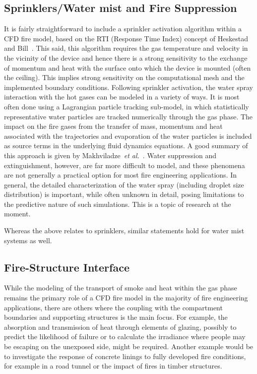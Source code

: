 \documentclass[graybox]{svmult}
\begin{document}
\subsection{Sprinklers/Water mist and Fire Suppression}

It is fairly straightforward to include a sprinkler activation algorithm within a CFD fire model, based on the RTI (Response Time Index) concept of Heskestad and Bill~\cite{Heskestad:1988}. This said, this algorithm requires the gas temperature and velocity in the vicinity of the device and hence there is a strong sensitivity to the exchange of momentum and heat with the surface onto which the device is mounted (often the ceiling). This implies strong sensitivity on the computational mesh and the implemented boundary conditions. Following sprinkler activation, the water spray interaction with the hot gases can be modeled in a variety of ways. It is most often done using a Lagrangian particle tracking sub-model, in which statistically representative water particles are tracked numerically through the gas phase. The impact on the fire gases from the transfer of mass, momentum and heat associated with the trajectories and evaporation of the water particles is included as source terms in the underlying fluid dynamics equations. A good summary of this approach is given by Makhviladze~{\em et al.}~\cite{Makhviladze}. Water suppression and extinguishment, however, are far more difficult to model, and these phenomena are not generally a practical option for most fire engineering applications. In general, the detailed characterization of the water spray (including droplet size distribution) is important, while often unknown in detail, posing limitations to the predictive nature of such simulations. This is a topic of research at the moment.

Whereas the above relates to sprinklers, similar statements hold for water mist systems as well.


\subsection{Fire-Structure Interface}

While the modeling of the transport of smoke and heat within the gas phase remains the primary role of a CFD fire model in the majority of fire engineering applications, there are others where the coupling with the compartment boundaries and supporting structures is the main focus. For example, the absorption and transmission of heat through elements of glazing, possibly to predict the likelihood of failure or to calculate the irradiance where people may be escaping on the unexposed side, might be required. Another example would be to investigate the response of concrete linings to fully developed fire conditions, for example in a road tunnel or the impact of fires in timber structures.
\end{document}
